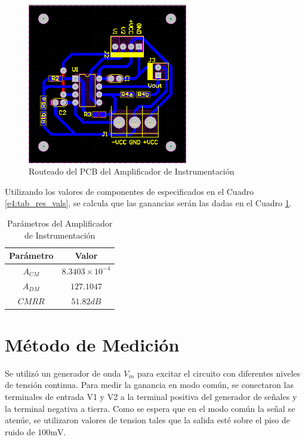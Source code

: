 \begin{figure}[!ht]
\begin{center}
\includegraphics[height=7cm]{../Ex4/Informe/res/altium/pcb.png}
\caption{Routeado del PCB del Amplificador de Instrumentación}
\label{e4:fig_pcb_route}
\end{center}
\end{figure}

\newpage

Utilizando los valores de componentes de especificados en el Cuadro \ref{e4:tab_res_vals}, se calcula que las ganancias serán las dadas en el Cuadro \ref{e4:tab_A}.

\begin{table}[!ht]
\begin{center}
\begin{tabular}{||c|c||}
\hline
Parámetro	&Valor	\\
\hline
$A_{CM}$	&$8.3403\times	10^{-4}$	\\
$A_{DM}$	&$127.1047$	\\
$CMRR$	&$51.82 dB$	\\
\hline
\end{tabular}
\caption{Parámetros del Amplificador de Instrumentación}
\label{e4:tab_A}
\end{center}
\end{table}

\section{Método de Medición}
Se utilizó un generador de onda $V_{in}$ para excitar el circuito con diferentes niveles de tensión continua. 
Para medir la ganancia en modo común, se conectaron las terminales de entrada V1 y V2 a la terminal positiva del generador de señales y la terminal negativa a tierra.
Como se espera que en el modo común la señal se atenúe, se utilizaron valores de tension tales que la salida esté sobre el piso de ruido de $100 \si{\milli\volt}$.


